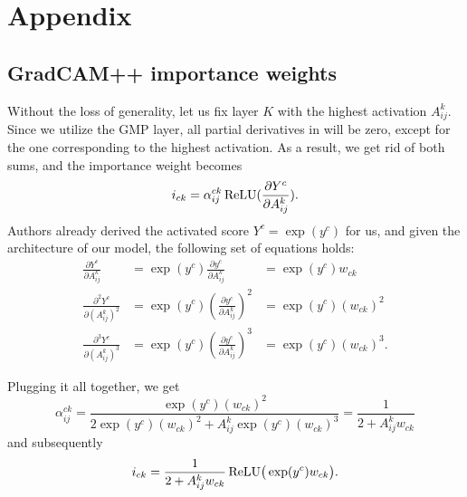 \renewcommand{\thechapter}{A}
\chapter{Appendix}



\lstset{style=mystyle}

\section*{GradCAM++ importance weights}\label{sec:grad-cam-plus-plus-weight-derivation}

Without the loss of generality, let us fix layer $K$ with the highest activation $A^k_{ij}$.
Since we utilize the GMP layer, all partial derivatives in  will be zero, except for the one corresponding to the highest activation.
As a result, we get rid of both sums, and the importance weight becomes 
\begin{equation}
    i_{ck} = \alpha^{ck}_{ij} \operatorname{ReLU}(\frac{\partial Y^c}{\partial A^k_{ij}}).
\end{equation}
Authors already derived the activated score $Y^c = \exp(y^c)$ for us, and given the architecture of our model, the following set of equations holds:
\begin{equation}
\begin{aligned}
  \frac{\partial Y^c}{\partial A_{ij}^k}       &= \exp(y^c) \frac{\partial y^c}{\partial A_{ij}^k} &= \exp(y^c) w_{ck}     \\
  \frac{\partial^2 Y^c}{\partial (A_{ij}^k)^2} &= \exp(y^c) (\frac{\partial y^c}{\partial A_{ij}^k})^2 &= \exp(y^c) (w_{ck})^2 \\
  \frac{\partial^3 Y^c}{\partial (A_{ij}^k)^3} &= \exp(y^c) (\frac{\partial y^c}{\partial A_{ij}^k})^3 &= \exp(y^c) (w_{ck})^3.
\end{aligned}
\end{equation}

Plugging it all together, we get 
\begin{equation}
    \alpha_{ij}^{ck} = \frac{\exp(y^c) (w_{ck})^2}{2 \exp(y^c) (w_{ck})^2 + A^k_{ij} \exp(y^c) (w_{ck})^3} = \frac{1}{2 + A^k_{ij}w_{ck}}
\end{equation}
and subsequently
\begin{equation}
    i_{ck} = \frac{1}{2 + A^k_{ij}w_{ck}} \operatorname{ReLU}\bigr(\exp(y^c)w_{ck}\bigl).
\end{equation}

